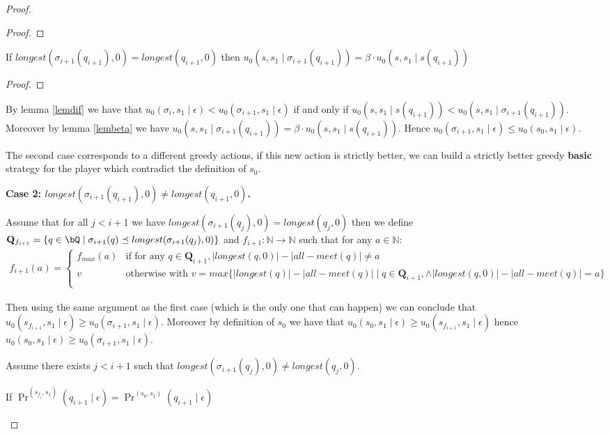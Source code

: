 \begin{proof}
\begin{proof}
\fi
\end{proof}

\begin{mylem}
\label{lembeta}
If $longest(\sigma_{i+1}(q_{i+1}),0) = longest(q_{i+1},0)$ then  $u_0(s,s_1 \mid \sigma_{i+1}(q_{i+1})) = \beta \cdot u_0(s,s_1 \mid s(q_{i+1}))$
\end{mylem}
\begin{proof}
\end{proof}

By lemma \ref{lemdif} we have that $u_0(\sigma_i,s_1 \mid \epsilon) < u_0(\sigma_{i+1},s_1 \mid \epsilon)$ if and only if $u_0(s,s_1 \mid s(q_{i+1})) < u_0(s,s_1 \mid \sigma_{i+1}(q_{i+1}))$.
Moreover by lemma \ref{lembeta} we have $u_0(s,s_1 \mid \sigma_{i+1}(q_{i+1})) = \beta \cdot u_0(s,s_1 \mid s(q_{i+1}))$.
Hence $u_0(\sigma_{i+1},s_1 \mid \epsilon) \leq u_0(s_0,s_1 \mid \epsilon)$.

\bigskip
The second case corresponds to a different greedy actions, if this new action is strictly better, we can build a strictly better greedy \textbf{basic} strategy for the player which contradict the definition of $s_0$.

\textbf{Case 2: $longest(\sigma_{i+1}(q_{i+1}),0) \neq longest(q_{i+1},0)$.}

Assume that for all $j < i+1$ we have $longest(\sigma_{i+1}(q_{j}),0) = longest(q_{j},0)$ then we define $\mathbf{Q}_{f_{i+1}} = \{q \in \bQ \mid \sigma_{i+1}(q) \preceq longest(\sigma_{i+1}(q_{j}),0) \}$ and  $f_{i+1} : \mathbb{N} \rightarrow \mathbb{N}$ such that for any $a \in \mathbb{N}$:
\begin{eqnarray*}
f_{i+1}(a) =
\begin{cases}
f_{max}(a) & \text{if for any } q \in \mathbf{Q}_{i+1}, |longest(q,0)| - |all-meet(q)| \neq a\\
v & \text{otherwise with } v = max \{|longest(q)| - |all-meet(q)| \mid q \in \mathbf{Q}_{i+1}, \land |longest(q,0)| - |all-meet(q)| = a \}\\
\end{cases}
\end{eqnarray*}

Then using the same argument as the first case (which is the only one that can happen) we can conclude that  $u_0(s_{f_{i+1}},s_1 \mid \epsilon) \geq u_0(\sigma_{i+1},s_1 \mid \epsilon)$. Moreover by definition of $s_0$ we have that
$u_0(s_0,s_1 \mid \epsilon) \geq u_0(s_{f_{i+1}},s_1 \mid \epsilon)$ hence $u_0(s_0,s_1 \mid \epsilon) \geq u_0(\sigma_{i+1},s_1 \mid \epsilon)$.

\bigskip
Assume there exists $j < i+1$ such that $longest(\sigma_{i+1}(q_{j}),0) \neq longest(q_{j},0)$.

\begin{mylem}
If $\Pr^{(s_{f_j},s_1)}(q_{i+1} \mid \epsilon) = \Pr^{(s_{0},s_1)}(q_{i+1} \mid \epsilon)$
\end{mylem}



\end{proof}
